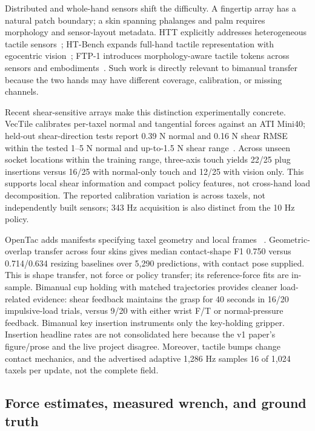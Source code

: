 Distributed and whole-hand sensors shift the difficulty. A fingertip array has a
natural patch boundary; a skin spanning phalanges and palm requires morphology
and sensor-layout metadata. HTT explicitly addresses heterogeneous tactile
sensors~\cite{bi2026htt}; HT-Bench expands full-hand tactile representation with
egocentric vision~\cite{huang2026htbench}; FTP-1 introduces morphology-aware
tactile tokens across sensors and embodiments~\cite{yuan2026ftp1}. Such work is
directly relevant to bimanual transfer because the two hands may have different
coverage, calibration, or missing channels.

Recent shear-sensitive arrays make this distinction experimentally concrete.
VecTile calibrates per-taxel normal and tangential forces against an ATI Mini40;
held-out shear-direction tests report 0.39 N normal and 0.16 N shear RMSE within
the tested 1--5 N normal and up-to-1.5 N shear range~\cite{update2026vectile}.
Across unseen socket locations within the training range, three-axis touch yields
22/25 plug insertions versus 16/25 with normal-only touch and 12/25 with vision
only. This supports local shear information and compact policy features, not
cross-hand load decomposition. The reported calibration variation is across
taxels, not independently built sensors; 343 Hz acquisition is also distinct
from the 10 Hz policy.

OpenTac adds manifests specifying taxel geometry and local frames
~\cite{update2026opentac}. Geometric-overlap transfer across four skins gives
median contact-shape F1 0.750 versus 0.714/0.634 resizing baselines over 5,290
predictions, with contact pose supplied. This is shape transfer, not force or
policy transfer; its reference-force fits are in-sample. Bimanual cup holding
with matched trajectories provides cleaner load-related evidence: shear feedback maintains the
grasp for 40 seconds in 16/20 impulsive-load trials, versus 9/20 with either wrist
F/T or normal-pressure feedback. Bimanual key insertion instruments only the
key-holding gripper. Insertion headline rates are not consolidated here because
the v1 paper's figure/prose and the live project disagree. Moreover, tactile
bumps change contact mechanics, and the advertised adaptive 1,286 Hz samples
16 of 1,024 taxels per update, not the complete field.

\subsection{Force estimates, measured wrench, and ground truth}

